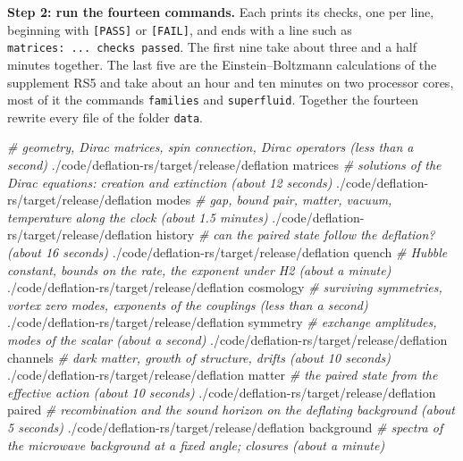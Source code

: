 \documentclass[
  10pt,
]{article}
\newenvironment{Shaded}{}{}
\newcommand{\CommentTok}[1]{\textcolor[rgb]{0.38,0.63,0.69}{\textit{#1}}}
\newcommand{\ExtensionTok}[1]{#1}
\newcommand{\NormalTok}[1]{#1}
\begin{document}
\textbf{Step 2: run the fourteen commands.} Each prints its checks, one
per line, beginning with \texttt{{[}PASS{]}} or \texttt{{[}FAIL{]}}, and
ends with a line such as \texttt{matrices:\ ...\ checks\ passed}. The
first nine take about three and a half minutes together. The last five
are the Einstein--Boltzmann calculations of the supplement RS5 and take
about an hour and ten minutes on two processor cores, most of it the
commands \texttt{families} and \texttt{superfluid}. Together the
fourteen rewrite every file of the folder \texttt{data}.

\begin{Shaded}
\begin{Highlighting}[]
\CommentTok{\# geometry, Dirac matrices, spin connection, Dirac operators           (less than a second)}
\ExtensionTok{./code/deflation{-}rs/target/release/deflation}\NormalTok{ matrices}
\CommentTok{\# solutions of the Dirac equations: creation and extinction           (about 12 seconds)}
\ExtensionTok{./code/deflation{-}rs/target/release/deflation}\NormalTok{ modes}
\CommentTok{\# gap, bound pair, matter, vacuum, temperature along the clock        (about 1.5 minutes)}
\ExtensionTok{./code/deflation{-}rs/target/release/deflation}\NormalTok{ history}
\CommentTok{\# can the paired state follow the deflation?                          (about 16 seconds)}
\ExtensionTok{./code/deflation{-}rs/target/release/deflation}\NormalTok{ quench}
\CommentTok{\# Hubble constant, bounds on the rate, the exponent under H2          (about a minute)}
\ExtensionTok{./code/deflation{-}rs/target/release/deflation}\NormalTok{ cosmology}
\CommentTok{\# surviving symmetries, vortex zero modes, exponents of the couplings (less than a second)}
\ExtensionTok{./code/deflation{-}rs/target/release/deflation}\NormalTok{ symmetry}
\CommentTok{\# exchange amplitudes, modes of the scalar                            (about a second)}
\ExtensionTok{./code/deflation{-}rs/target/release/deflation}\NormalTok{ channels}
\CommentTok{\# dark matter, growth of structure, drifts                            (about 10 seconds)}
\ExtensionTok{./code/deflation{-}rs/target/release/deflation}\NormalTok{ matter}
\CommentTok{\# the paired state from the effective action                          (about 10 seconds)}
\ExtensionTok{./code/deflation{-}rs/target/release/deflation}\NormalTok{ paired}
\CommentTok{\# recombination and the sound horizon on the deflating background     (about 5 seconds)}
\ExtensionTok{./code/deflation{-}rs/target/release/deflation}\NormalTok{ background}
\CommentTok{\# spectra of the microwave background at a fixed angle; closures      (about a minute)}

\end{Highlighting}
\end{Shaded}
\end{document}
